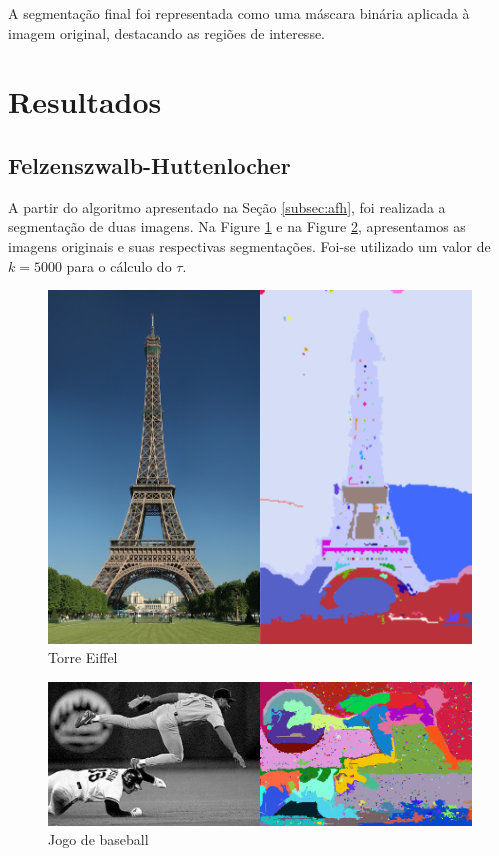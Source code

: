\documentclass[12pt]{article}
\begin{document}
A segmentação final foi representada como uma máscara binária aplicada à imagem original, destacando as regiões de interesse.

\section{Resultados} \label{sec:results}
\subsection{Felzenszwalb-Huttenlocher}
A partir do algoritmo apresentado na Seção \ref{subsec:afh}, foi realizada a segmentação de duas imagens. Na Figure \ref{fig:torre-eiffel} e na Figure \ref{fig:baseball}, apresentamos as imagens originais e suas respectivas segmentações. Foi-se utilizado um valor de $k = 5000$ para o cálculo do $\tau$.

\begin{figure}[ht]
\centering
\includegraphics[width=.75\textwidth]{torre_eiffel.png}
\caption{Torre Eiffel}
\label{fig:torre-eiffel}
\end{figure}

\begin{figure}[ht]
\centering
\includegraphics[width=1\textwidth]{jogo_baseball.png}
\caption{Jogo de baseball}
\label{fig:baseball}
\end{figure}
\end{document}
